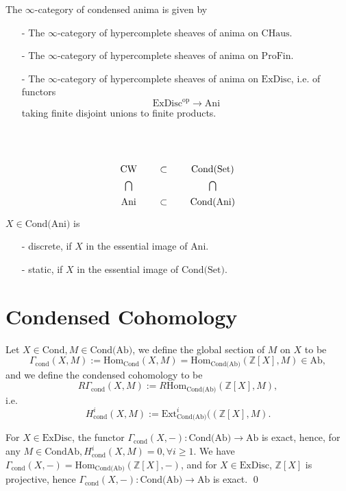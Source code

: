 \documentclass[UTF8,12,a4paper]{ctexart}
\theoremstyle{definition}
\newcommand{\Cond}{\text{Cond}}
\begin{document}
\dfn 
The $\infty$-category of condensed anima is given by 
\begin{itemize}
	\item [-] The $\infty$-category of hypercomplete sheaves of anima on $\text{CHaus}.$
	\item [-] The $\infty$-category of hypercomplete sheaves of anima on $\text{ProFin}.$
	\item [-] The $\infty$-category of hypercomplete sheaves of anima on $\text{ExDisc}$, i.e. of functors
	$$\text{ExDisc}^\text{op}\longrightarrow \text{Ani}$$
	taking finite disjoint unions to finite products.
\end{itemize}
~\\
~\\
\begin{equation*}
\xymatrix@=18pt{
	\text{CW}\ar@{}[d]|{\bigcap}  & \subset &\text{Cond(Set)}\ar@{}[d]|{\bigcap}\\
	\text{Ani}& \subset &\text{Cond(Ani)}
}
\end{equation*}
\dfn 
$X\in \text{Cond(Ani)}$ is
\begin{itemize}
	\item [-] discrete, if $X$ in the essential image of $\text{Ani}.$
	\item [-] static, if $X$ in the essential image of $\text{Cond(Set)}.$
\end{itemize}












\newpage
\section{Condensed Cohomology}

\dfn
Let $X\in \text{Cond}, M\in\text{Cond(Ab)}$, we define the global section of $M$ on $X$ to be  
$$
\Gamma_{\text{cond}}(X,M):=\text{Hom}_{\Cond}(X,M)=\text{Hom}_{\text{Cond(Ab)}}(\mathbb{Z}\left[X\right],M)\in\text{Ab},
$$
and we define the condensed cohomology to be 
$$
R\Gamma_{\text{cond}}(X,M):=R\text{Hom}_{\text{Cond(Ab)}}(\mathbb{Z}\left[X\right],M),
$$ i.e.
$$
H^i_{\text{cond}}(X,M):=\text{Ext}^i_{\text{Cond(Ab)}}((\mathbb{Z}\left[X\right],M).
$$

\lem\label{exdisc}
For $X\in \text{ExDisc}$, the functor $\Gamma_{\text{cond}}(X,-):\text{Cond(Ab)}\to \text{Ab}$ is exact, hence, for any $M\in \text{CondAb}, H^i_{\text{cond}}(X,M)=0, \forall i\geq 1.$
\pf
We have $\Gamma_{\text{cond}}(X,-)=\text{Hom}_{\text{Cond(Ab)}}(\mathbb{Z}\left[X\right],-)$, and for $X\in \text{ExDisc}$, $\mathbb{Z}\left[X\right]$ is projective, hence $\Gamma_{\text{cond}}(X,-):\text{Cond(Ab)}\to \text{Ab}$ is exact.
\qed
\end{document}
